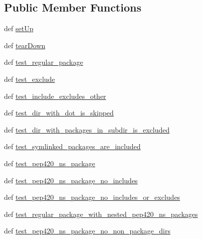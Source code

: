 \subsection*{Public Member Functions}
\begin{DoxyCompactItemize}
\item 
def \hyperlink{classsetuptools_1_1tests_1_1test__find__packages_1_1TestFindPackages_aa1276d69464fda9c3839592745d2be4c}{set\+Up}
\item 
def \hyperlink{classsetuptools_1_1tests_1_1test__find__packages_1_1TestFindPackages_a1ebb414afc951e94de0df92d1eafb65c}{tear\+Down}
\item 
def \hyperlink{classsetuptools_1_1tests_1_1test__find__packages_1_1TestFindPackages_a5dbe6f69c4f9df0d5546082970aa0104}{test\+\_\+regular\+\_\+package}
\item 
def \hyperlink{classsetuptools_1_1tests_1_1test__find__packages_1_1TestFindPackages_a7ebbd7e8e235f0719dc44bad82014cad}{test\+\_\+exclude}
\item 
def \hyperlink{classsetuptools_1_1tests_1_1test__find__packages_1_1TestFindPackages_aba050c5e5b83252d8ab805c43150d644}{test\+\_\+include\+\_\+excludes\+\_\+other}
\item 
def \hyperlink{classsetuptools_1_1tests_1_1test__find__packages_1_1TestFindPackages_a5484e7052ca785de297457cc9f8317a6}{test\+\_\+dir\+\_\+with\+\_\+dot\+\_\+is\+\_\+skipped}
\item 
def \hyperlink{classsetuptools_1_1tests_1_1test__find__packages_1_1TestFindPackages_a20dbe172d48091d39ab4c91ceeb1a110}{test\+\_\+dir\+\_\+with\+\_\+packages\+\_\+in\+\_\+subdir\+\_\+is\+\_\+excluded}
\item 
def \hyperlink{classsetuptools_1_1tests_1_1test__find__packages_1_1TestFindPackages_a0958867a0905047e95d74832858277b4}{test\+\_\+symlinked\+\_\+packages\+\_\+are\+\_\+included}
\item 
def \hyperlink{classsetuptools_1_1tests_1_1test__find__packages_1_1TestFindPackages_a2422f72baa6cb87c0201db9c53875e55}{test\+\_\+pep420\+\_\+ns\+\_\+package}
\item 
def \hyperlink{classsetuptools_1_1tests_1_1test__find__packages_1_1TestFindPackages_a5c4bff0c13260db8493e316a64d2da9a}{test\+\_\+pep420\+\_\+ns\+\_\+package\+\_\+no\+\_\+includes}
\item 
def \hyperlink{classsetuptools_1_1tests_1_1test__find__packages_1_1TestFindPackages_a3e4daefb13e0c241eac6fdac7da4c5ed}{test\+\_\+pep420\+\_\+ns\+\_\+package\+\_\+no\+\_\+includes\+\_\+or\+\_\+excludes}
\item 
def \hyperlink{classsetuptools_1_1tests_1_1test__find__packages_1_1TestFindPackages_a05aa8ff07a9b229875a71663851b8da4}{test\+\_\+regular\+\_\+package\+\_\+with\+\_\+nested\+\_\+pep420\+\_\+ns\+\_\+packages}
\item 
def \hyperlink{classsetuptools_1_1tests_1_1test__find__packages_1_1TestFindPackages_a0e764aa75d43f779eaa59be44f47e4fd}{test\+\_\+pep420\+\_\+ns\+\_\+package\+\_\+no\+\_\+non\+\_\+package\+\_\+dirs}
\end{DoxyCompactItemize}
